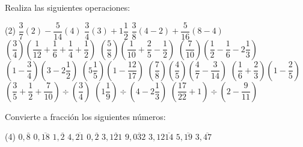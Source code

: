 \documentclass[sin nombre]{srs}
\begin{document}
Realiza las siguientes operaciones:\\[0pt]
\begin{preguntas}[after-item-skip=15pt,after-skip=20pt](2)
\pregunta $\dfrac{3}{7}\left(2\right)-\dfrac{5}{14}\left(4\right)$
\pregunta $\dfrac{3}{4}\left(3\right)+1\dfrac{1}{2}$
\pregunta $\dfrac{3}{8}\left(4-2\right)+\dfrac{5}{16}\left(8-4\right)$
\pregunta $\left(\dfrac{3}{4}\right)\left(\dfrac{1}{12}+\dfrac{1}{6}+\dfrac{1}{4}+\dfrac{1}{2}\right)$
\pregunta $\left(\dfrac{5}{8}\right)\left(\dfrac{1}{10}+\dfrac{2}{5}-\dfrac{1}{2}\right)$
\pregunta $\left(\dfrac{7}{10}\right)\left(\dfrac{1}{2}-\dfrac{1}{6}-2\dfrac{1}{3}\right)$
\pregunta $\left(1-\dfrac{3}{4}\right)\left(3-2\dfrac{1}{2}\right)$
\pregunta $\left(5\dfrac{1}{5}\right)\left(1-\dfrac{12}{17}\right)$
\pregunta $\left(\dfrac{7}{8}\right)\left(\dfrac{4}{5}\right)\left(\dfrac{4}{7}-\dfrac{3}{14}\right)$
\pregunta $\left(\dfrac{1}{6}+\dfrac{2}{3}\right)\left(1-\dfrac{2}{5}\right)$
\pregunta $\left(\dfrac{3}{5}+\dfrac{1}{2}+\dfrac{7}{10}\right)\div\left(\dfrac{3}{4}\right)$
\pregunta $\left(1\dfrac{1}{9}\right)\div\left(4-2\dfrac{1}{3}\right)$
\pregunta $\left(\dfrac{17}{22}+1\right)\div\left(2-\dfrac{9}{11}\right)$
\end{preguntas}

Convierte a fracción los siguientes números:\\
\begin{preguntas}[after-item-skip=15pt,after-skip=20pt](4)
\pregunta $0,\overline{8}$
\pregunta $0,\overline{18}$
\pregunta $1,\overline{2}$
\pregunta $4,\overline{21}$
\pregunta $0,\overline{2}$
\pregunta $3,\overline{121}$
\pregunta $9,\overline{032}$
\pregunta $3,12\overline{14}$
\pregunta $5,\overline{19}$
\pregunta $3,\overline{47}$
\end{preguntas}
\end{document}

